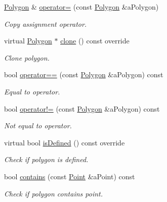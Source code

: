 \begin{DoxyCompactItemize}
\hyperlink{classlibrary_1_1math_1_1geom_1_1d2_1_1objects_1_1_polygon}{Polygon} \& \hyperlink{classlibrary_1_1math_1_1geom_1_1d2_1_1objects_1_1_polygon_afd72b5c2aa958835958d197ee57c3152}{operator=} (const \hyperlink{classlibrary_1_1math_1_1geom_1_1d2_1_1objects_1_1_polygon}{Polygon} \&a\+Polygon)
\begin{DoxyCompactList}\small\item\em Copy assignment operator. \end{DoxyCompactList}\item 
virtual \hyperlink{classlibrary_1_1math_1_1geom_1_1d2_1_1objects_1_1_polygon}{Polygon} $\ast$ \hyperlink{classlibrary_1_1math_1_1geom_1_1d2_1_1objects_1_1_polygon_a15bbbe7e468a50d6059e2df946175e1c}{clone} () const override
\begin{DoxyCompactList}\small\item\em Clone polygon. \end{DoxyCompactList}\item 
bool \hyperlink{classlibrary_1_1math_1_1geom_1_1d2_1_1objects_1_1_polygon_a2d92051aa3535659ec1ca1849ea65fa0}{operator==} (const \hyperlink{classlibrary_1_1math_1_1geom_1_1d2_1_1objects_1_1_polygon}{Polygon} \&a\+Polygon) const
\begin{DoxyCompactList}\small\item\em Equal to operator. \end{DoxyCompactList}\item 
bool \hyperlink{classlibrary_1_1math_1_1geom_1_1d2_1_1objects_1_1_polygon_a904fe22c8a690a6b5eb4f8746602d637}{operator!=} (const \hyperlink{classlibrary_1_1math_1_1geom_1_1d2_1_1objects_1_1_polygon}{Polygon} \&a\+Polygon) const
\begin{DoxyCompactList}\small\item\em Not equal to operator. \end{DoxyCompactList}\item 
virtual bool \hyperlink{classlibrary_1_1math_1_1geom_1_1d2_1_1objects_1_1_polygon_a83e0962f91f0732048e156ad634faaea}{is\+Defined} () const override
\begin{DoxyCompactList}\small\item\em Check if polygon is defined. \end{DoxyCompactList}\item 
bool \hyperlink{classlibrary_1_1math_1_1geom_1_1d2_1_1objects_1_1_polygon_a9a59a791536ec6ca38fe75d378aadc8e}{contains} (const \hyperlink{classlibrary_1_1math_1_1geom_1_1d2_1_1objects_1_1_point}{Point} \&a\+Point) const
\begin{DoxyCompactList}\small\item\em Check if polygon contains point. \end{DoxyCompactList}\item 

\end{DoxyCompactItemize}
